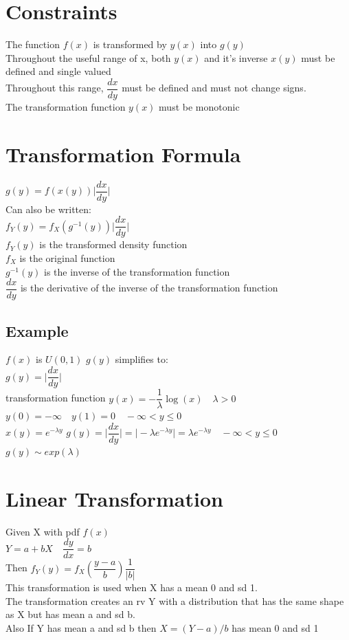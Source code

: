 \documentclass[openany]{book}
\begin{document}
\begin{flushleft}
\section{Constraints}
The function $f(x)$ is transformed by $y(x)$ into $g(y)$\\
Throughout the useful range of x, both $y(x)$ and it's inverse $x(y)$ must be defined and single valued\\
Throughout this range, $\dfrac{dx}{dy}$ must be defined and must not change signs.\\
The transformation function $y(x)$ must be monotonic\\
\section{Transformation Formula}
$g(y)=f(x(y))\bigg|\dfrac{dx}{dy}\bigg |$\\
Can also be written:\\
$f_Y(y)=f_X(g^{-1}(y))\bigg|\dfrac{dx}{dy}\bigg |$\\
$f_Y(y)$ is the transformed density function\\
$f_X$ is the original function\\
$g^{-1}(y)$ is the inverse of the transformation function\\
$\dfrac{dx}{dy}$ is the derivative of the inverse of the transformation function
\subsection{Example}
$f(x)$ is $U(0,1)$ \quad $g(y)$ simplifies to:\\
$g(y)=\bigg|\dfrac{dx}{dy}\bigg |$\\
transformation function $y(x)=-\dfrac{1}{\lambda}\log(x) \quad \lambda>0$\\
$y(0)=-\infty \quad y(1)=0 \quad -\infty < y\leq 0 $\\
$x(y)=e^{-\lambda y}$\medbreak
$g(y)=\bigg|\dfrac{dx}{dy}\bigg|=\bigg|-\lambda e^{-\lambda y}\bigg|=\lambda e^{-\lambda y} \quad -\infty < y\leq 0 $\\
$g(y)\sim exp(\lambda)$\\
\section{Linear Transformation}
Given X with pdf $f(x)$\\
$Y=a+bX \quad \dfrac{dy}{dx}=b$\\
Then $f_Y(y)=f_X\left(\dfrac{y-a}{b}\right)\dfrac{1}{|b|}$\\
This transformation is used when X has a mean 0 and sd 1.\\
The transformation creates an rv Y with a distribution that has the same shape as X but has mean a and sd b.\\
Also If Y has mean a and sd b then $X=(Y-a)/b$ has mean 0 and sd 1

\end{flushleft}
\end{document}
